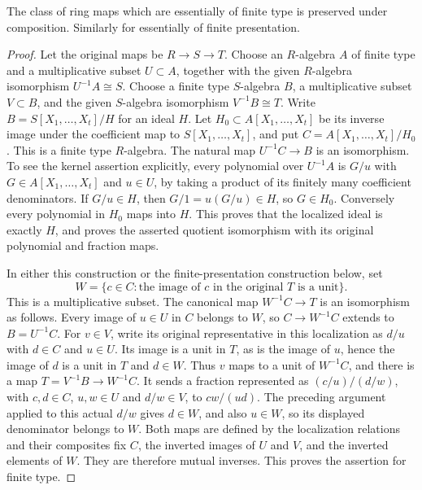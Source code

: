 \begin{lemma}
\label{editorial-source-lemma-composition-essentially-of-finite-type}
The class of ring maps which are essentially of finite type is
preserved under composition. Similarly for essentially of finite
presentation.
\end{lemma}

\begin{proof}
Let the original maps be $R\to S\to T$. Choose an $R$-algebra
$A$ of finite type and a multiplicative subset $U\subset A$,
together with the given $R$-algebra isomorphism $U^{-1}A\cong S$.
Choose a finite type $S$-algebra $B$, a multiplicative subset
$V\subset B$, and the given $S$-algebra isomorphism
$V^{-1}B\cong T$.
Write $B=S[X_1,\ldots,X_t]/H$ for an ideal $H$.
Let $H_0\subset A[X_1,\ldots,X_t]$ be its inverse image under
the coefficient map to $S[X_1,\ldots,X_t]$, and put
$C=A[X_1,\ldots,X_t]/H_0$. This is a finite type $R$-algebra.
The natural map $U^{-1}C\to B$ is an isomorphism.
To see the kernel assertion explicitly, every polynomial over
$U^{-1}A$ is $G/u$ with $G\in A[X_1,\ldots,X_t]$ and
$u\in U$, by taking a product of its finitely many coefficient
denominators. If $G/u\in H$, then $G/1=u(G/u)\in H$,
so $G\in H_0$. Conversely every polynomial in $H_0$ maps
into $H$. This proves that the localized ideal is exactly
$H$, and proves the asserted quotient isomorphism with its
original polynomial and fraction maps.

In either this construction or the finite-presentation construction
below, set
$$
W=\{c\in C:\text{the image of }c\text{ in the original }T
\text{ is a unit}\}.
$$
This is a multiplicative subset. The canonical map
$W^{-1}C\to T$ is an isomorphism as follows.
Every image of $u\in U$ in $C$ belongs to $W$, so
$C\to W^{-1}C$ extends to $B=U^{-1}C$.
For $v\in V$, write its original representative in this
localization as $d/u$ with $d\in C$ and $u\in U$.
Its image is a unit in $T$, as is the image of $u$, hence
the image of $d$ is a unit in $T$ and $d\in W$.
Thus $v$ maps to a unit of $W^{-1}C$, and there is a map
$T=V^{-1}B\to W^{-1}C$.
It sends a fraction represented as $(c/u)/(d/w)$, with
$c,d\in C$, $u,w\in U$ and $d/w\in V$, to
$cw/(ud)$. The preceding argument applied to this actual
$d/w$ gives $d\in W$, and also $u\in W$, so its
displayed denominator belongs to $W$.
Both maps are defined by the localization relations and their
composites fix $C$, the inverted images of $U$ and $V$,
and the inverted elements of $W$. They are therefore mutual
inverses. This proves the assertion for finite type.


\end{proof}
